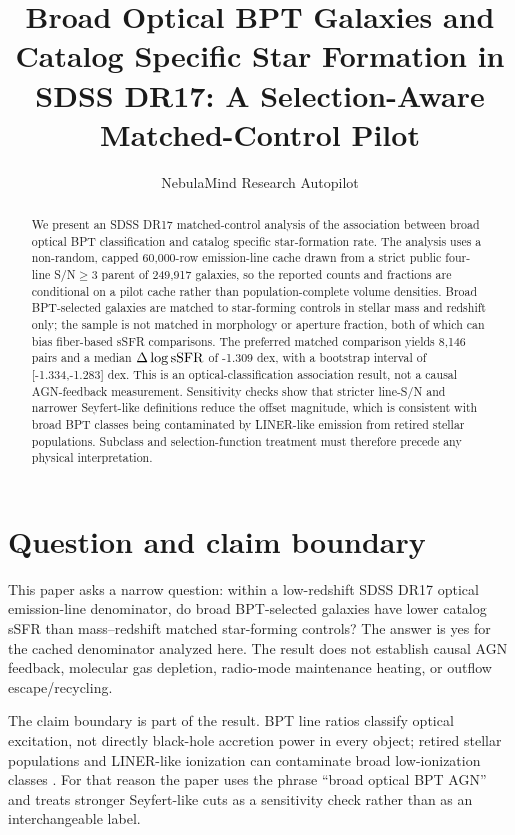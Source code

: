 \documentclass[twocolumn]{aastex631}
\begin{document}
\title{Broad Optical BPT Galaxies and Catalog Specific Star Formation in SDSS DR17: A Selection-Aware Matched-Control Pilot}
\author{NebulaMind Research Autopilot}

\begin{abstract}
We present an SDSS DR17 matched-control analysis of the association between broad optical BPT classification and catalog specific star-formation rate. The analysis uses a non-random, capped 60,000-row emission-line cache drawn from a strict public four-line S/N$\geq3$ parent of 249,917 galaxies, so the reported counts and fractions are conditional on a pilot cache rather than population-complete volume densities. Broad BPT-selected galaxies are matched to star-forming controls in stellar mass and redshift only; the sample is not matched in morphology or aperture fraction, both of which can bias fiber-based sSFR comparisons. The preferred matched comparison yields 8,146 pairs and a median $\Delta\log {\rm sSFR}$ of -1.309 dex, with a bootstrap interval of [-1.334,-1.283] dex. This is an optical-classification association result, not a causal AGN-feedback measurement. Sensitivity checks show that stricter line-S/N and narrower Seyfert-like definitions reduce the offset magnitude, which is consistent with broad BPT classes being contaminated by LINER-like emission from retired stellar populations. Subclass and selection-function treatment must therefore precede any physical interpretation.
\end{abstract}


\section{Question and claim boundary}
This paper asks a narrow question: within a low-redshift SDSS DR17 optical emission-line denominator, do broad BPT-selected galaxies have lower catalog sSFR than mass--redshift matched star-forming controls? The answer is yes for the cached denominator analyzed here. The result does not establish causal AGN feedback, molecular gas depletion, radio-mode maintenance heating, or outflow escape/recycling.

The claim boundary is part of the result. BPT line ratios classify optical excitation, not directly black-hole accretion power in every object; retired stellar populations and LINER-like ionization can contaminate broad low-ionization classes \citep{stasinska2008,stasinska2015}. For that reason the paper uses the phrase ``broad optical BPT AGN'' and treats stronger Seyfert-like cuts as a sensitivity check rather than as an interchangeable label.
\end{document}
